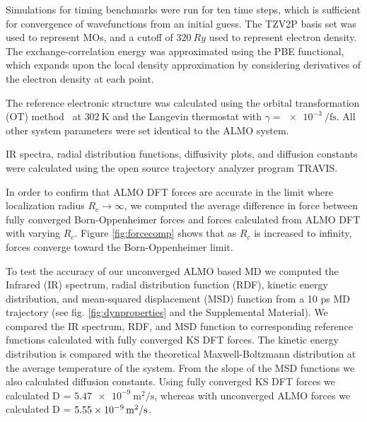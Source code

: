 \documentclass[aps,prl,reprint,amsmath,amssymb]{revtex4-1}
\begin{document}
Simulations for timing benchmarks were run for ten time steps, which is sufficient for convergence of wavefunctions from an initial guess.
The TZV2P basis set was used to represent MOs, and a cutoff of $\SI{320}{Ry}$ used to represent electron density. 
The exchange-correlation energy was approximated using the PBE functional, which expands upon the local density approximation by considering derivatives of the electron density at each point.~\cite{a:PBEfunctional} 

The reference electronic structure was calculated using the orbital transformation (OT) method~\cite{a:ot,a:ot2} at $\SI{302}{\K}$ and the Langevin thermostat with $\gamma = \SI{e-3}{\per\fs}$. 
All other system parameters were set identical to the ALMO system.

IR spectra, radial distribution functions, diffusivity plots, and diffusion constants were calculated using the open source trajectory analyzer program TRAVIS.~\cite{a:travis-main,a:travis-ir1,a:travis-ir2}


In order to confirm that ALMO DFT forces are accurate in the limit where localization radius $R_{c} \rightarrow \infty$, we computed the average difference in force between fully converged Born-Oppenheimer forces and forces calculated from ALMO DFT with varying $R_{c}$. 
Figure \ref{fig:forcecomp} shows that as $R_{c}$ is increased to infinity, forces converge toward the Born-Oppenheimer limit.

To test the accuracy of our unconverged ALMO based MD we computed the Infrared (IR) spectrum, radial distribution function (RDF), kinetic energy distribution, and mean-squared displacement (MSD) function from a 10 ps MD trajectory (see fig. \ref{fig:dynproperties} and the Supplemental Material). 
We compared the IR spectrum, RDF, and MSD function to corresponding reference functions calculated with fully converged KS DFT forces.
The kinetic energy distribution is compared with the theoretical Maxwell-Boltzmann distribution at the average temperature of the system.
From the slope of the MSD functions we also calculated diffusion constants.
Using fully converged KS DFT forces we calculated D = $\SI{5.47e-9}{\m^{2}\per\s}$, whereas with unconverged ALMO forces we calculated D = $\SI{5.55E-09}{\m^{2}\per\s}$.
\end{document}
